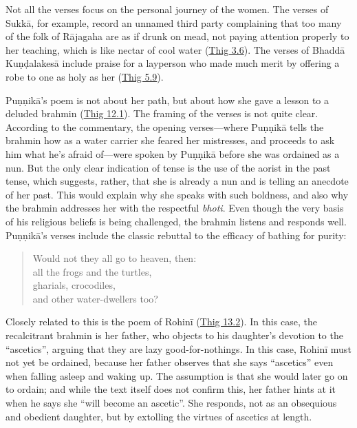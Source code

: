 \documentclass[12pt,openany]{book}%
\begin{document}
Not all the verses focus on the personal journey of the women. The verses of \textsanskrit{Sukkā}, for example, record an unnamed third party complaining that too many of the folk of \textsanskrit{Rājagaha} are as if drunk on mead, not paying attention properly to her teaching, which is like nectar of cool water (\href{https://suttacentral.net/thig3.6}{Thig 3.6}). The verses of \textsanskrit{Bhaddā} \textsanskrit{Kuṇḍalakesā} include praise for a layperson who made much merit by offering a robe to one as holy as her (\href{https://suttacentral.net/thig5.9}{Thig 5.9}).

\textsanskrit{Puṇṇikā}’s poem is not about her path, but about how she gave a lesson to a deluded brahmin (\href{https://suttacentral.net/thig12.1}{Thig 12.1}). The framing of the verses is not quite clear. According to the commentary, the opening verses—where \textsanskrit{Puṇṇikā} tells the brahmin how as a water carrier she feared her mistresses, and proceeds to ask him what he’s afraid of—were spoken by \textsanskrit{Puṇṇikā} before she was ordained as a nun. But the only clear indication of tense is the use of the aorist in the past tense, which suggests, rather, that she is already a nun and is telling an anecdote of her past. This would explain why she speaks with such boldness, and also why the brahmin addresses her with the respectful \textit{bhoti}. Even though the very basis of his religious beliefs is being challenged, the brahmin listens and responds well. \textsanskrit{Puṇṇikā}’s verses include the classic rebuttal to the efficacy of bathing for purity:

\begin{verse}%
Would not they all go to heaven, then: \\
all the frogs and the turtles, \\
gharials, crocodiles, \\
and other water-dwellers too?

%
\end{verse}

Closely related to this is the poem of \textsanskrit{Rohinī} (\href{https://suttacentral.net/thig13.2}{Thig 13.2}). In this case, the recalcitrant brahmin is her father, who objects to his daughter’s devotion to the “ascetics”, arguing that they are lazy good-for-nothings. In this case, \textsanskrit{Rohinī} must not yet be ordained, because her father observes that she says “ascetics” even when falling asleep and waking up. The assumption is that she would later go on to ordain; and while the text itself does not confirm this, her father hints at it when he says she “will become an ascetic”. She responds, not as an obsequious and obedient daughter, but by extolling the virtues of ascetics at length.
\end{document}
